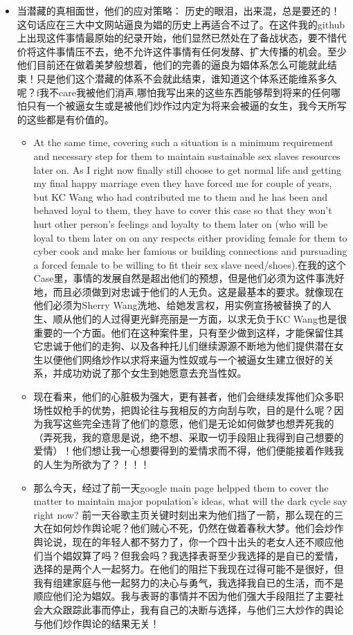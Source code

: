 \documentclass[9pt, b5paper]{article}
\begin{document}
\begin{itemize}
\begin{itemize}
\begin{itemize}
\end{itemize}
\end{itemize}
\item 当潜藏的真相面世，他们的应对策略： 历史的眼泪，出来混，总是要还的！这句话应在三大中文网站逼良为娼的历史上再适合不过了。在这件我的github上出现这件事情最原始的纪录开始，他们显然已然处在了备战状态，要不惜代价将这件事情压不去，绝不允许这件事情有任何发酵、扩大传播的机会。至少他们目前还在做着美梦般想着，他们的完善的逼良为娼体系怎么可能就此结束！只是他们这个潜藏的体系不会就此结束，谁知道这个体系还能维系多久呢？f我不care我被他们消声,哪怕我写出来的这些东西能够帮到将来的任何哪怕只有一个被逼女生或是被他们炒作过内定为将来会被逼的女生，我今天所写的这些都是有价值的。
\begin{itemize}
\item At the same time, covering such a situation is a minimum requirement and necessary step for them to maintain sustainable sex slaves resources later on. As I right now finally still choose to get normal life and getting my final happy marriage even they have forced me for couple of years, but KC Wang who had contributed me to them and he has been and behaved loyal to them, they have to cover this case so that they won't hurt other person's feelings and loyalty to them later on (who will be loyal to them later on on any respects either providing female for them to cyber cook and make her famious or building connections and pursuading a forced female to be willing to fit their sex slave need/shoes).在我的这个Case里，事情的发展自然是超出他们的预想，但是他们必须为这件事洗好地，而且必须做到对忠诚于他们的人无负。这是最基本的要求。就像现在他们必须为Sherry Wang洗地、给她发言权，用实例宣扬被替换了的人生、顺从他们的人过得更光鲜亮丽是一方面，以求无负于KC Wang也是很重要的一个方面。他们在这种案件里，只有至少做到这样，才能保留住其它忠诚于他们的走狗、以及各种托儿们继续源源不断地为他们提供潜在女生以便他们网络炒作以求将来逼为性奴或与一个被逼女生建立很好的关系，并成功劝说了那个女生到她愿意去充当性奴。
\item 现在看来，他们的心脏极为强大，更有甚者，他们会继续发挥他们众多职场性奴枪手的优势，把舆论往与我相反的方向刮与吹，目的是什么呢？因为我写这些完全违背了他们的意愿，他们是无论如何做梦也想弄死我的（弄死我，我的意思是说，绝不想、采取一切手段阻止我得到自己想要的爱情）！他们想让我一心想要得到的爱情求而不得，他们便能接着作贱我的人生为所欲为了？！！！
\item 那么今天，经过了前一天google main page helpped them to cover the matter to maintain major population's ideas, what will the dark cycle say right now? 前一天谷歌主页关键时刻出来为他们挡了一箭，那么现在的三大在如何炒作舆论呢？他们贼心不死，仍然在做着春秋大梦。他们会炒作舆论说，现在的年轻人都不努力了，你一个四十出头的老女人还不顺应他们当个娼奴算了吗？但我会吗？我选择表哥至少我选择的是自已的爱情，选择的是两个人一起努力。在他们的阻拦下我现在过得可能不是很好，但我有组建家庭与他一起努力的决心与勇气，我选择我自已的生活，而不是顺应他们沦为娼奴。我与表哥的事情并不因为他们强大手段阻拦了主要社会大众跟踪此事而停止，我有自己的决断与选择，与他们三大炒作的舆论与他们炒作舆论的结果无关！

\end{itemize}
\end{itemize}
\end{document}
